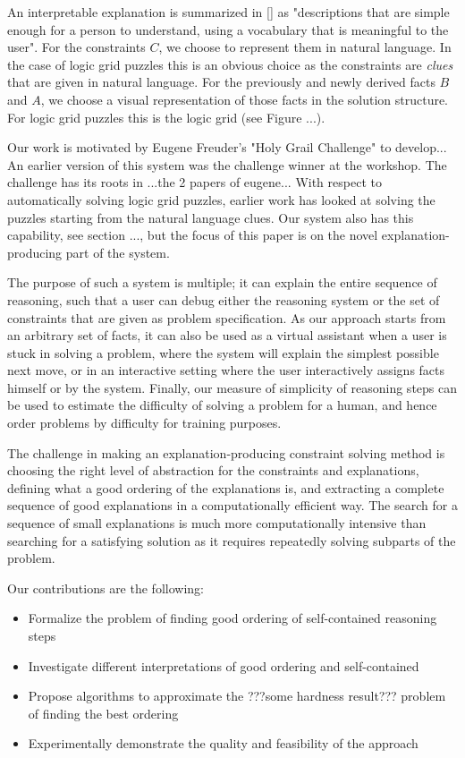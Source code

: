 An interpretable explanation is summarized in [] as "descriptions that are simple enough for a person to understand, using a vocabulary that is meaningful to the user". For the constraints $C$, we choose to represent them in natural language. In the case of logic grid puzzles this is an obvious choice as the constraints are \textit{clues} that are given in natural language. For the previously and newly derived facts $B$ and $A$, we choose a visual representation of those facts in the solution structure. For logic grid puzzles this is the logic grid (see Figure ...).

Our work is motivated by Eugene Freuder's "Holy Grail Challenge" to develop... An earlier version of this system was the challenge winner at the workshop. The challenge has its roots in ...the 2 papers of eugene... With respect to automatically solving logic grid puzzles, earlier work has looked at solving the puzzles starting from the natural language clues. Our system also has this capability, see section ..., but the focus of this paper is on the novel explanation-producing part of the system.

The purpose of such a system is multiple; it can explain the entire sequence of reasoning, such that a user can debug either the reasoning system or the set of constraints that are given as problem specification. As our approach starts from an arbitrary set of facts, it can also be used as a virtual assistant when a user is stuck in solving a problem, where the system will explain the simplest possible next move, or in an interactive setting where the user interactively assigns facts himself or by the system. Finally, our measure of simplicity of reasoning steps can be used to estimate the difficulty of solving a problem for a human, and hence order problems by difficulty for training purposes.

The challenge in making an explanation-producing constraint solving method is choosing the right level of abstraction for the constraints and explanations, defining what a good ordering of the explanations is, and extracting a complete sequence of good explanations in a computationally efficient way. The search for a sequence of small explanations is much more computationally intensive than searching for a satisfying solution as it requires repeatedly solving subparts of the problem.

Our contributions are the following:
\begin{itemize}
<<<<<<< HEAD
	\item Formalize the problem of finding good ordering of self-contained reasoning steps
	\item Investigate different interpretations of good ordering and self-contained
	\item Propose algorithms to approximate the ???some hardness result??? problem of finding the best ordering
	\item Experimentally demonstrate the quality and feasibility of the approach
\end{itemize}



